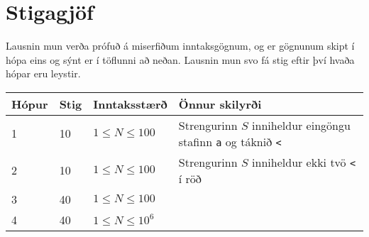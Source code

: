 \section*{Stigagjöf}
Lausnin mun verða prófuð á miserfiðum inntaksgögnum, og er gögnunum skipt í
hópa eins og sýnt er í töflunni að neðan. Lausnin mun svo fá stig eftir því
hvaða hópar eru leystir.

\begin{tabular}{|l|l|l|l|}
\hline
Hópur & Stig & Inntaksstærð & Önnur skilyrði  \\ \hline
1     & 10         & $ 1 \le N \le 100$ & Strengurinn $S$ inniheldur eingöngu stafinn \texttt{a} og táknið \texttt{<}\\ \hline
2     & 10         & $ 1 \le N \le 100$ & Strengurinn $S$ inniheldur ekki tvö \texttt{<} í röð\\ \hline
3     & 40         & $ 1 \le N \le 100$ & \\ \hline
4     & 40         & $ 1 \le N \le 10^6$ & \\ \hline
\end{tabular}
